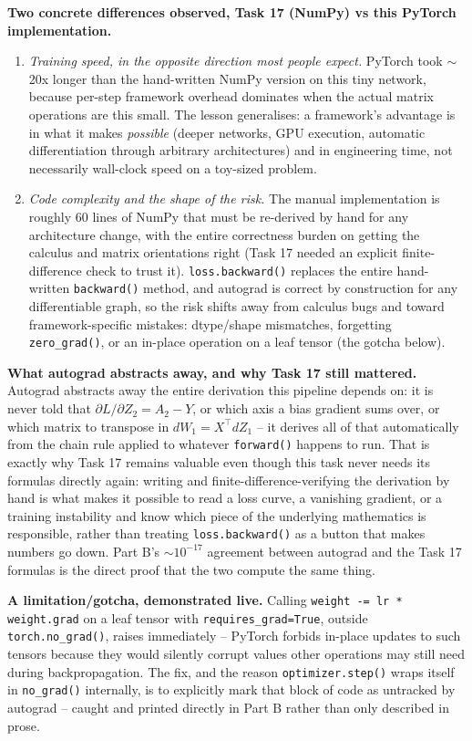 \documentclass[11pt,a4paper]{article}
\begin{document}
\textbf{Two concrete differences observed, Task 17 (NumPy) vs this PyTorch
implementation.}
\begin{enumerate}
    \item \emph{Training speed, in the opposite direction most people expect.}
    PyTorch took $\sim$20x longer than the hand-written NumPy version on this tiny
    network, because per-step framework overhead dominates when the actual matrix
    operations are this small. The lesson generalises: a framework's advantage is in
    what it makes \emph{possible} (deeper networks, GPU execution, automatic
    differentiation through arbitrary architectures) and in engineering time, not
    necessarily wall-clock speed on a toy-sized problem.
    \item \emph{Code complexity and the shape of the risk.} The manual implementation
    is roughly 60 lines of NumPy that must be re-derived by hand for any architecture
    change, with the entire correctness burden on getting the calculus and matrix
    orientations right (Task 17 needed an explicit finite-difference check to trust
    it). \texttt{loss.backward()} replaces the entire hand-written \texttt{backward()}
    method, and autograd is correct by construction for any differentiable graph, so
    the risk shifts away from calculus bugs and toward framework-specific mistakes:
    dtype/shape mismatches, forgetting \texttt{zero\_grad()}, or an in-place operation
    on a leaf tensor (the gotcha below).
\end{enumerate}

\textbf{What autograd abstracts away, and why Task 17 still mattered.} Autograd
abstracts away the entire derivation this pipeline depends on: it is never told that
$\partial L/\partial Z_2 = A_2 - Y$, or which axis a bias gradient sums over, or which
matrix to transpose in $dW_1 = X^\top dZ_1$ -- it derives all of that automatically from
the chain rule applied to whatever \texttt{forward()} happens to run. That is exactly
why Task 17 remains valuable even though this task never needs its formulas directly
again: writing and finite-difference-verifying the derivation by hand is what makes it
possible to read a loss curve, a vanishing gradient, or a training instability and know
which piece of the underlying mathematics is responsible, rather than treating
\texttt{loss.backward()} as a button that makes numbers go down. Part B's
$\sim10^{-17}$ agreement between autograd and the Task 17 formulas is the direct proof
that the two compute the same thing.

\textbf{A limitation/gotcha, demonstrated live.} Calling
\texttt{weight -= lr * weight.grad} on a leaf tensor with \texttt{requires\_grad=True},
outside \texttt{torch.no\_grad()}, raises immediately -- PyTorch forbids in-place
updates to such tensors because they would silently corrupt values other operations may
still need during backpropagation. The fix, and the reason \texttt{optimizer.step()}
wraps itself in \texttt{no\_grad()} internally, is to explicitly mark that block of code
as untracked by autograd -- caught and printed directly in Part B rather than only
described in prose.
\end{document}
